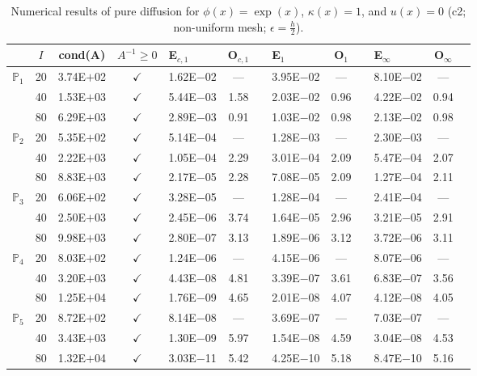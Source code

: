 \begin{table}[H]
\centering
\caption{Numerical results of pure diffusion for $\phi(x)=\exp(x)$, $\kappa(x)=1$, and $u(x)=0$ (c2; non-uniform mesh; $\epsilon=\frac{h}{2}$).}
\begin{tabular}{@{}l c c c l c c l c c l c c@{}}
\toprule
 & $I$ & cond(A) & $A^{-1}\geq 0$ &  E$_{c,1}$ & O$_{c,1}$ && E$_1$ & O$_1$ && E$_{\infty}$ & O$_{\infty}$\\
\midrule
\multirow{3}{*}{$\mathbb{P}_{1}$}
 & 20 & 3.74E$+$02 & $\checkmark$ & 1.62E$-$02 & --- && 3.95E$-$02 & --- && 8.10E$-$02 & ---\\
 & 40 & 1.53E$+$03 & $\checkmark$ & 5.44E$-$03 & 1.58 && 2.03E$-$02 & 0.96 && 4.22E$-$02 & 0.94\\
 & 80 & 6.29E$+$03 & $\checkmark$ & 2.89E$-$03 & 0.91 && 1.03E$-$02 & 0.98 && 2.13E$-$02 & 0.98\\
\midrule
\multirow{3}{*}{$\mathbb{P}_{2}$}
 & 20 & 5.35E$+$02 & $\checkmark$ & 5.14E$-$04 & --- && 1.28E$-$03 & --- && 2.30E$-$03 & ---\\
 & 40 & 2.22E$+$03 & $\checkmark$ & 1.05E$-$04 & 2.29 && 3.01E$-$04 & 2.09 && 5.47E$-$04 & 2.07\\
 & 80 & 8.83E$+$03 & $\checkmark$ & 2.17E$-$05 & 2.28 && 7.08E$-$05 & 2.09 && 1.27E$-$04 & 2.11\\
\midrule
\multirow{3}{*}{$\mathbb{P}_{3}$}
 & 20 & 6.06E$+$02 & $\checkmark$ & 3.28E$-$05 & --- && 1.28E$-$04 & --- && 2.41E$-$04 & ---\\
 & 40 & 2.50E$+$03 & $\checkmark$ & 2.45E$-$06 & 3.74 && 1.64E$-$05 & 2.96 && 3.21E$-$05 & 2.91\\
 & 80 & 9.98E$+$03 & $\checkmark$ & 2.80E$-$07 & 3.13 && 1.89E$-$06 & 3.12 && 3.72E$-$06 & 3.11\\
\midrule
\multirow{3}{*}{$\mathbb{P}_{4}$}
 & 20 & 8.03E$+$02 & $\checkmark$ & 1.24E$-$06 & --- && 4.15E$-$06 & --- && 8.07E$-$06 & ---\\
 & 40 & 3.20E$+$03 & $\checkmark$ & 4.43E$-$08 & 4.81 && 3.39E$-$07 & 3.61 && 6.83E$-$07 & 3.56\\
 & 80 & 1.25E$+$04 & $\checkmark$ & 1.76E$-$09 & 4.65 && 2.01E$-$08 & 4.07 && 4.12E$-$08 & 4.05\\
\midrule
\multirow{3}{*}{$\mathbb{P}_{5}$}
 & 20 & 8.72E$+$02 & $\checkmark$ & 8.14E$-$08 & --- && 3.69E$-$07 & --- && 7.03E$-$07 & ---\\
 & 40 & 3.43E$+$03 & $\checkmark$ & 1.30E$-$09 & 5.97 && 1.54E$-$08 & 4.59 && 3.04E$-$08 & 4.53\\
 & 80 & 1.32E$+$04 & $\checkmark$ & 3.03E$-$11 & 5.42 && 4.25E$-$10 & 5.18 && 8.47E$-$10 & 5.16\\
\bottomrule
\end{tabular}
\end{table}